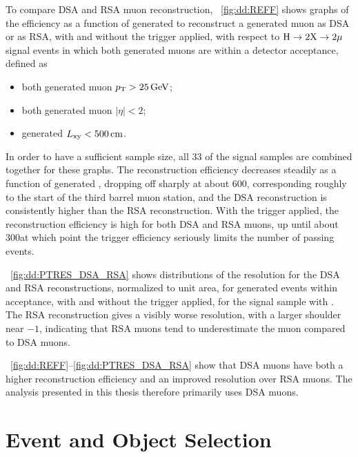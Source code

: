 To compare DSA and RSA muon reconstruction, \Fig~\ref{fig:dd:REFF} shows graphs of the efficiency as a function of generated \Lxy to reconstruct a generated muon as DSA or as RSA, with and without the trigger applied, with respect to \mbox{$\mathrm{H}\to2\mathrm{X}\to2\mathrm{\mu}$} signal events in which both generated muons are within a detector acceptance, defined as
\begin{itemize}
  \item both generated muon $p_{\mathrm{T}} > 25\,\text{Ge\hspace{-.08em}V}$;
  \item both generated muon $|\eta| < 2$;
  \item generated \mbox{$L_{\mathrm{xy}} < 500\,\text{cm}$}.
\end{itemize}
In order to have a sufficient sample size, all 33 of the \twoMu signal samples are combined together for these graphs.
The reconstruction efficiency decreases steadily as a function of generated \Lxy, dropping off sharply at about 600\cm, corresponding roughly to the start of the third barrel muon station, and the DSA reconstruction is consistently higher than the RSA reconstruction.
With the trigger applied, the reconstruction efficiency is high for both DSA and RSA muons, up until about 300\cm at which point the trigger efficiency seriously limits the number of passing events.

\Fig~\ref{fig:dd:PTRES_DSA_RSA} shows distributions of the \pT resolution for the DSA and RSA reconstructions, normalized to unit area, for generated events within acceptance, with and without the trigger applied, for the \twoMu signal sample with .
The RSA reconstruction gives a visibly worse \pT resolution, with a larger shoulder near $-1$, indicating that RSA muons tend to underestimate the muon \pT compared to DSA muons.

\Figs~\ref{fig:dd:REFF}--\ref{fig:dd:PTRES_DSA_RSA} show that DSA muons have both a higher reconstruction efficiency and an improved \pT resolution over RSA muons.
The analysis presented in this thesis therefore primarily uses DSA muons.

\section{Event and Object Selection}
